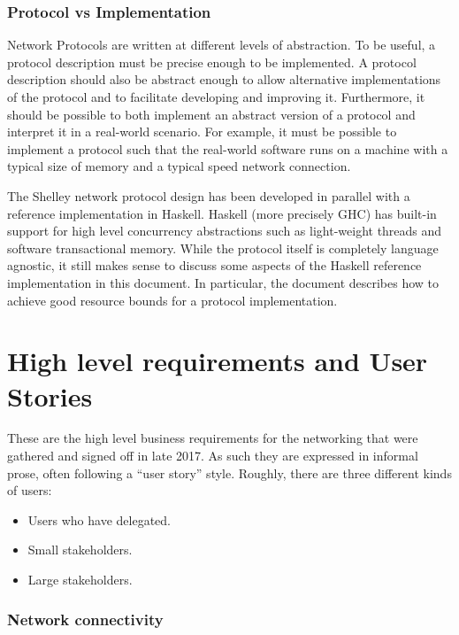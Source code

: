 \documentclass{report}
\newcommand{\wip}[1]{}
\newcommand{\wip}[1]{\color{magenta}{#1}\color{black}}
\theoremstyle{definition}{
  \newtheorem{lemma}{Lemma}[section] %
  \newtheorem{definition}[lemma]{Definition}
}
\theoremstyle{theorem}{
  \newtheorem{invariant}[lemma]{Invariant}
  \newtheorem{proofobligation}[lemma]{Proof Obligation}
}
\numberwithin{equation}{lemma}
\begin{document}
\subsubsection{Protocol vs Implementation}
Network Protocols are written at different levels of abstraction.
To be useful, a protocol description must be precise enough to be implemented.
A protocol description should also be abstract enough to allow alternative implementations of the protocol
and to facilitate developing and improving it.
Furthermore, it should be possible to both implement an
abstract version of a protocol
and interpret it in a real-world scenario.
For example, it must be possible to implement a protocol
such that the real-world software runs on a machine with a typical size of memory
and a typical speed network connection.

The Shelley network protocol design has been developed in parallel
with a reference implementation in Haskell.
Haskell (more precisely GHC) has built-in support for high level concurrency abstractions
such as light-weight threads and software transactional memory.
While the protocol itself is completely language agnostic, it still makes sense to discuss some
aspects of the Haskell reference implementation in this document.
In particular, the document describes how to achieve good resource bounds for
a protocol implementation.

\wip{
  \subparagraph{Threats}
  Reference the Threats section.
  'eclipse' can be deterred}


\wip{TODO:extended abstract, scope of the document}

\section{High level requirements and User Stories}

These are the high level business requirements for the networking that were
gathered and signed off in late 2017. As such they are expressed in informal
prose, often following a ``user story'' style.
Roughly, there are three different kinds of users:
\begin{itemize}
\item Users who have delegated.
\item Small stakeholders.
\item Large stakeholders.
\end{itemize}

\subsubsection{Network connectivity}\label{network-connectivity}
\end{document}
